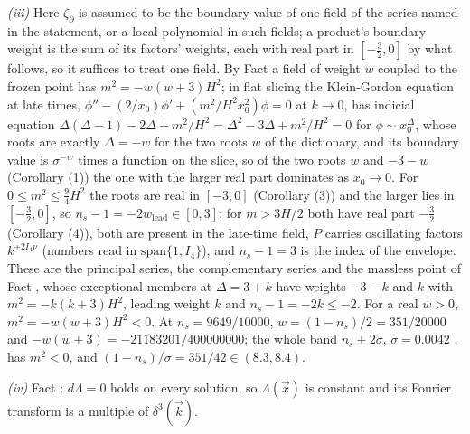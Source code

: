\emph{(iii)} Here $\zeta_{\partial}$ is assumed to be the boundary value of one field of the series named in the statement, or a local polynomial in such fields; a product's boundary weight is the sum of its factors' weights, each with real part in $[-\tfrac32, 0]$ by what follows, so it suffices to treat one field. By Fact  a field of weight $w$ coupled to the frozen point has $m^{2} = -w(w+3)H^{2}$; in flat slicing the Klein-Gordon equation at late times, $\phi'' - (2/x_{0})\phi' + (m^{2}/H^{2}x_{0}^{2})\phi = 0$ at $k \to 0$, has indicial equation $\Delta(\Delta - 1) - 2\Delta + m^{2}/H^{2} = \Delta^{2} - 3\Delta + m^{2}/H^{2} = 0$ for $\phi \sim x_{0}^{\Delta}$, whose roots are exactly $\Delta = -w$ for the two roots $w$ of the dictionary, and its boundary value is $\sigma^{-w}$ times a function on the slice, so of the two roots $w$ and $-3-w$ (Corollary (1)) the one with the larger real part dominates as $x_{0} \to 0$. For $0 \le m^{2} \le \tfrac94 H^{2}$ the roots are real in $[-3, 0]$ (Corollary (3)) and the larger lies in $[-\tfrac32, 0]$, so $n_{s} - 1 = -2w_{\mathrm{lead}} \in [0, 3]$; for $m > 3H/2$ both have real part $-\tfrac32$ (Corollary (4)), both are present in the late-time field, $P$ carries oscillating factors $k^{\pm 2I_4\nu}$ (numbers read in $\mathrm{span}\{1, I_4\}$), and $n_{s} - 1 = 3$ is the index of the envelope. These are the principal series, the complementary series and the massless point of Fact , whose exceptional members at $\Delta = 3 + k$ have weights $-3-k$ and $k$ with $m^{2} = -k(k+3)H^{2}$, leading weight $k$ and $n_{s} - 1 = -2k \le -2$. For a real $w > 0$, $m^{2} = -w(w+3)H^{2} < 0$. At $n_{s} = 9649/10000$, $w = (1 - n_{s})/2 = 351/20000$ and $-w(w+3) = -21183201/400000000$; the whole band $n_{s} \pm 2\sigma$, $\sigma = 0.0042$ \cite{Planck2018}, has $m^{2} < 0$, and $(1 - n_{s})/\sigma = 351/42 \in (8.3, 8.4)$.

\emph{(iv)} Fact : $d\Lambda = 0$ holds on every solution, so $\Lambda(\vec x)$ is constant and its Fourier transform is a multiple of $\delta^{3}(\vec k)$.


